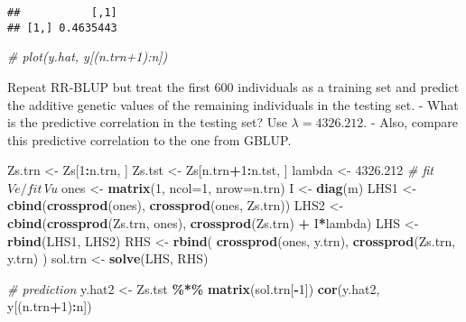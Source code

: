 \documentclass[
]{article}
\newenvironment{Shaded}{\begin{snugshade}}{\end{snugshade}}
\newcommand{\AttributeTok}[1]{\textcolor[rgb]{0.13,0.29,0.53}{#1}}
\newcommand{\CommentTok}[1]{\textcolor[rgb]{0.56,0.35,0.01}{\textit{#1}}}
\newcommand{\DecValTok}[1]{\textcolor[rgb]{0.00,0.00,0.81}{#1}}
\newcommand{\FloatTok}[1]{\textcolor[rgb]{0.00,0.00,0.81}{#1}}
\newcommand{\FunctionTok}[1]{\textcolor[rgb]{0.13,0.29,0.53}{\textbf{#1}}}
\newcommand{\NormalTok}[1]{#1}
\newcommand{\OtherTok}[1]{\textcolor[rgb]{0.56,0.35,0.01}{#1}}
\newcommand{\SpecialCharTok}[1]{\textcolor[rgb]{0.81,0.36,0.00}{\textbf{#1}}}
\begin{document}
\begin{verbatim}
##           [,1]
## [1,] 0.4635443
\end{verbatim}

\begin{Shaded}
\begin{Highlighting}[]
\CommentTok{\# plot(y.hat, y[(n.trn+1):n])}
\end{Highlighting}
\end{Shaded}

Repeat RR-BLUP but treat the first 600 individuals as a training set and
predict the additive genetic values of the remaining individuals in the
testing set. - What is the predictive correlation in the testing set?
Use \(\lambda = 4326.212\). - Also, compare this predictive correlation
to the one from GBLUP.

\begin{Shaded}
\begin{Highlighting}[]
\NormalTok{Zs.trn }\OtherTok{\textless{}{-}}\NormalTok{ Zs[}\DecValTok{1}\SpecialCharTok{:}\NormalTok{n.trn, ]}
\NormalTok{Zs.tst }\OtherTok{\textless{}{-}}\NormalTok{ Zs[n.trn}\SpecialCharTok{+}\DecValTok{1}\SpecialCharTok{:}\NormalTok{n.tst, ]}
\NormalTok{lambda }\OtherTok{\textless{}{-}} \FloatTok{4326.212} \CommentTok{\# fit$Ve / fit$Vu}
\NormalTok{ones }\OtherTok{\textless{}{-}} \FunctionTok{matrix}\NormalTok{(}\DecValTok{1}\NormalTok{, }\AttributeTok{ncol=}\DecValTok{1}\NormalTok{, }\AttributeTok{nrow=}\NormalTok{n.trn)}
\NormalTok{I }\OtherTok{\textless{}{-}} \FunctionTok{diag}\NormalTok{(m)}
\NormalTok{LHS1 }\OtherTok{\textless{}{-}} \FunctionTok{cbind}\NormalTok{(}\FunctionTok{crossprod}\NormalTok{(ones), }\FunctionTok{crossprod}\NormalTok{(ones, Zs.trn)) }
\NormalTok{LHS2 }\OtherTok{\textless{}{-}} \FunctionTok{cbind}\NormalTok{(}\FunctionTok{crossprod}\NormalTok{(Zs.trn, ones), }\FunctionTok{crossprod}\NormalTok{(Zs.trn) }\SpecialCharTok{+}\NormalTok{  I}\SpecialCharTok{*}\NormalTok{lambda)}
\NormalTok{LHS }\OtherTok{\textless{}{-}} \FunctionTok{rbind}\NormalTok{(LHS1, LHS2)}
\NormalTok{RHS }\OtherTok{\textless{}{-}} \FunctionTok{rbind}\NormalTok{( }\FunctionTok{crossprod}\NormalTok{(ones, y.trn), }\FunctionTok{crossprod}\NormalTok{(Zs.trn, y.trn) )}
\NormalTok{sol.trn }\OtherTok{\textless{}{-}} \FunctionTok{solve}\NormalTok{(LHS, RHS)}

\CommentTok{\# prediction}
\NormalTok{y.hat2 }\OtherTok{\textless{}{-}}\NormalTok{ Zs.tst }\SpecialCharTok{\%*\%} \FunctionTok{matrix}\NormalTok{(sol.trn[}\SpecialCharTok{{-}}\DecValTok{1}\NormalTok{])}
\FunctionTok{cor}\NormalTok{(y.hat2, y[(n.trn}\SpecialCharTok{+}\DecValTok{1}\NormalTok{)}\SpecialCharTok{:}\NormalTok{n])}
\end{Highlighting}
\end{Shaded}
\end{document}
